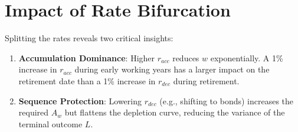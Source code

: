\documentclass[11pt,letterpaper]{article}
\begin{document}
\section{Impact of Rate Bifurcation}
Splitting the rates reveals two critical insights:
\begin{enumerate}
    \item \textbf{Accumulation Dominance}: Higher $r_{acc}$ reduces $w$ exponentially. A 1\% increase in $r_{acc}$ during early working years has a larger impact on the retirement date than a 1\% increase in $r_{dec}$ during retirement.
    \item \textbf{Sequence Protection}: Lowering $r_{dec}$ (e.g., shifting to bonds) increases the required $A_w$ but flattens the depletion curve, reducing the variance of the terminal outcome $L$.
\end{enumerate}
\end{document}
